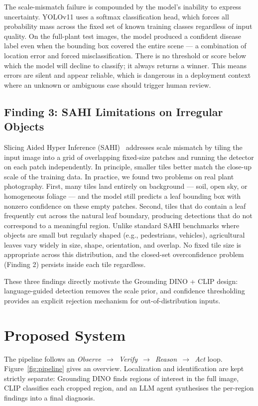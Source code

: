 \documentclass[runningheads]{llncs}
\begin{document}
The scale-mismatch failure is compounded by the model's inability to express uncertainty. YOLOv11 uses a softmax classification head, which forces all probability mass across the fixed set of known training classes regardless of input quality. On the full-plant test images, the model produced a confident disease label even when the bounding box covered the entire scene --- a combination of location error and forced misclassification. There is no threshold or score below which the model will decline to classify; it always returns a winner. This means errors are silent and appear reliable, which is dangerous in a deployment context where an unknown or ambiguous case should trigger human review.

\subsection{Finding 3: SAHI Limitations on Irregular Objects}

Slicing Aided Hyper Inference (SAHI)~\cite{wang2022sahi} addresses scale mismatch by tiling the input image into a grid of overlapping fixed-size patches and running the detector on each patch independently. In principle, smaller tiles better match the close-up scale of the training data. In practice, we found two problems on real plant photography. First, many tiles land entirely on background --- soil, open sky, or homogeneous foliage --- and the model still predicts a leaf bounding box with nonzero confidence on these empty patches. Second, tiles that do contain a leaf frequently cut across the natural leaf boundary, producing detections that do not correspond to a meaningful region. Unlike standard SAHI benchmarks where objects are small but regularly shaped (e.g., pedestrians, vehicles), agricultural leaves vary widely in size, shape, orientation, and overlap. No fixed tile size is appropriate across this distribution, and the closed-set overconfidence problem (Finding 2) persists inside each tile regardless.

These three findings directly motivate the Grounding DINO + CLIP design: language-guided detection removes the scale prior, and confidence thresholding provides an explicit rejection mechanism for out-of-distribution inputs.

\section{Proposed System}

The pipeline follows an \textit{Observe~$\rightarrow$~Verify~$\rightarrow$~Reason~$\rightarrow$~Act} loop. Figure~\ref{fig:pipeline} gives an overview. Localization and identification are kept strictly separate: Grounding DINO finds regions of interest in the full image, CLIP classifies each cropped region, and an LLM agent synthesises the per-region findings into a final diagnosis.
\end{document}
